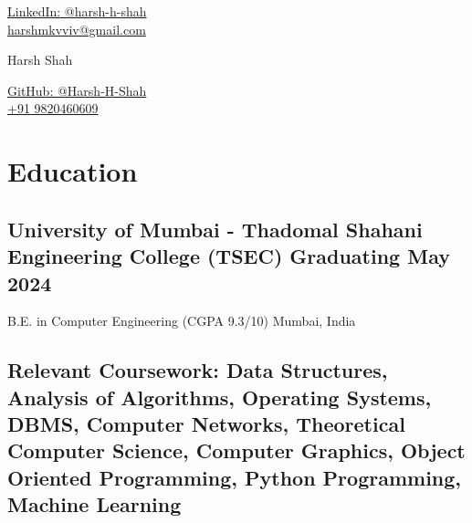 \documentclass[a4,10pt]{article}
\begin{document}
\begin{center}
    \begin{minipage}[b]{0.25\textwidth}
    \large  %
            {\href{https://www.linkedin.com/in/harsh-h-shah/}{
            \color{UI_blue} LinkedIn: @harsh-h-shah} } \\
            \large \href{mailto:harshmkvviv@gmail.com}{
            \color{UI_blue} harshmkvviv@gmail.com} 
    \end{minipage}%
    \begin{minipage}[b]{0.5\textwidth}
            \centering
            {\Huge Harsh Shah} \\ %
            \vspace{0.1cm}
    \end{minipage}%
    \begin{minipage}[b]{0.25\textwidth}
            \flushright \large  %
            {\href{https://www.github.com/harsh-h-shah/}{
            \color{UI_blue} GitHub: @Harsh-H-Shah} } \\
            \href{tel:+919820460609}{
            \color{UI_blue} +91 9820460609}
    \end{minipage}   
    
\vspace{-0.3cm} 
\end{center}


\section{Education}
\vspace{-0.1cm}
\subsection*{University of Mumbai - Thadomal Shahani Engineering College (TSEC) \hfill Graduating May 2024}{\normalsize \normalfont B.E. in Computer Engineering (CGPA 9.3/10) \hfill Mumbai, India}
\vspace{-0.3cm}
\subsection*{\normalfont \normalsize Relevant Coursework: Data Structures, Analysis of Algorithms, Operating Systems, DBMS, Computer Networks, Theoretical Computer Science, Computer Graphics, Object Oriented Programming, Python Programming, Machine Learning}
\vspace{0.1cm}
\end{document}

